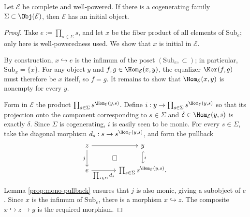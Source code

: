 \begin{lemma}\label{prop:cogenerator-initial-obj}
	Let $\mathcal{E}$ be complete and well-powered. If there is a cogenerating
	family $\Sigma\subset\Obj(\mathcal{E})$, then $\mathcal{E}$ has an initial
	object.
\end{lemma}
\begin{proof}
	Take $e:=\prod_{s\in\Sigma}s$, and let $x$ be the fiber product of all
	elements of $\mathrm{Sub}_e$; only here is well-poweredness used. We show
	that $x$ is initial in $\mathcal{E}$.

	By construction, $x\hookrightarrow e$ is the infimum of the poset
	$(\mathrm{Sub}_e,\subset)$; in particular, $\mathrm{Sub}_x=\{x\}$. For
	any object $y$ and $f,g\in\Hom_{\mathcal{E}}(x,y)$, the equalizer
	$\Ker(f,g)$ must therefore be $x$ itself, so $f=g$. It remains to show that
	$\Hom_{\mathcal{E}}(x,y)$ is nonempty for every $y$.

	Form in $\mathcal{E}$ the product
	$\prod_{s\in\Sigma}s^{\Hom_{\mathcal{E}}(y,s)}$. Define
	$i:y\to\prod_{s\in\Sigma}s^{\Hom_{\mathcal{E}}(y,s)}$ so that its
	projection onto the component corresponding to $s\in\Sigma$ and
	$\delta\in\Hom_{\mathcal{E}}(y,s)$ is exactly $\delta$. Since $\Sigma$ is
	cogenerating, $i$ is easily seen to be monic. For every $s\in\Sigma$, take
	the diagonal morphism $d_s:s\to s^{\Hom_{\mathcal{E}}(y,s)}$, and form the
	pullback
	\[\begin{tikzcd}[column sep=large]
		z \arrow[r] \arrow[d, "j"'] & y \arrow[hookrightarrow, d, "i"] \arrow[phantom, ld, "\Box" description] \\
		e \arrow[r, "{\prod_{s \in \Sigma} d_s}"'] &  \prod_{s \in \Sigma} s^{\Hom_{\mathcal{E}}(y, s)}.
	\end{tikzcd}\]
	Lemma \ref{prop:mono-pullback} ensures that $j$ is also monic, giving a
	subobject of $e$. Since $x$ is the infimum of $\mathrm{Sub}_e$, there is a
	morphism $x\hookrightarrow z$. The composite $x\hookrightarrow z\to y$ is
	the required morphism.
\end{proof}

